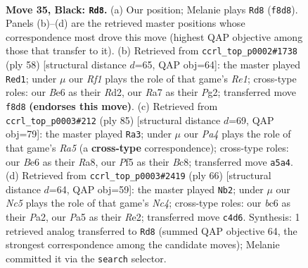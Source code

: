 \documentclass[11pt]{article}
\begin{document}
\clearpage

\begin{figure}[p]\centering
\begin{subfigure}{0.46\textwidth}\centering
\resizebox{\linewidth}{!}{%
\newchessgame
\chessboard[
  setfen={5r2/r7/p1B1bk2/p4ppp/2n5/P4PP1/1P5P/RKB2RN1 b - - 1 35},
  showmover=false,
  pgfstyle=straightmove, color=movearrow, markmove={f8-d8}
]}
\caption{}
\end{subfigure}\hfill
\begin{subfigure}{0.46\textwidth}\centering
\resizebox{\linewidth}{!}{%
\newchessgame
\chessboard[
  setfen={8/2r2pk1/p4np1/1prb3p/3N3P/P2B1P2/1P1R1KP1/4R3 w - - 2 30},
  showmover=false,
  pgfstyle=straightmove, color=movearrow, markmove={e1-d1}
]}
\caption{}
\end{subfigure}
\\[4pt]
\begin{subfigure}{0.46\textwidth}\centering
\resizebox{\linewidth}{!}{%
\newchessgame
\chessboard[
  setfen={r1b2bk1/p1B2p2/3P4/2n5/r2pP1p1/3P2P1/4BP1P/1R3RNK b - - 0 43},
  showmover=false,
  pgfstyle=straightmove, color=movearrow, markmove={a4-a3}
]}
\caption{}
\end{subfigure}\hfill
\begin{subfigure}{0.46\textwidth}\centering
\resizebox{\linewidth}{!}{%
\newchessgame
\chessboard[
  setfen={5rk1/1br5/3p4/2bP1p1p/1pN3p1/1P1B2P1/P3RPPK/3R4 w - - 0 34},
  showmover=false,
  pgfstyle=straightmove, color=movearrow, markmove={c4-b2}
]}
\caption{}
\end{subfigure}
\caption{\textbf{Move 35, Black: \texttt{Rd8}.} (a) Our position; Melanie plays \texttt{Rd8} (\texttt{f8d8}). Panels (b)--(d) are the retrieved master positions whose correspondence most drove this move (highest QAP objective among those that transfer to it). (b) Retrieved from \texttt{ccrl\_top\_p0002\#1738} (ply 58) [structural distance $d$=65, QAP obj=64]: the master played \texttt{Red1}; under $\mu$ our \emph{Rf1} plays the role of that game's \emph{Re1}; cross-type roles: our \emph{B}e6 as their \emph{R}d2, our \emph{R}a7 as their \emph{P}g2; transferred move \texttt{f8d8} \textbf{(endorses this move)}. (c) Retrieved from \texttt{ccrl\_top\_p0003\#212} (ply 85) [structural distance $d$=69, QAP obj=79]: the master played \texttt{Ra3}; under $\mu$ our \emph{Pa4} plays the role of that game's \emph{Ra5} (a \textbf{cross-type} correspondence); cross-type roles: our \emph{B}e6 as their \emph{R}a8, our \emph{P}f5 as their \emph{B}c8; transferred move \texttt{a5a4}. (d) Retrieved from \texttt{ccrl\_top\_p0003\#2419} (ply 66) [structural distance $d$=64, QAP obj=59]: the master played \texttt{Nb2}; under $\mu$ our \emph{Nc5} plays the role of that game's \emph{Nc4}; cross-type roles: our \emph{b}c6 as their \emph{P}a2, our \emph{P}a5 as their \emph{R}e2; transferred move \texttt{c4d6}. Synthesis: 1 retrieved analog transferred to \texttt{Rd8} (summed QAP objective 64, the strongest correspondence among the candidate moves); Melanie committed it via the \texttt{search} selector.}
\label{fig:thought-m69}
\end{figure}
\end{document}
